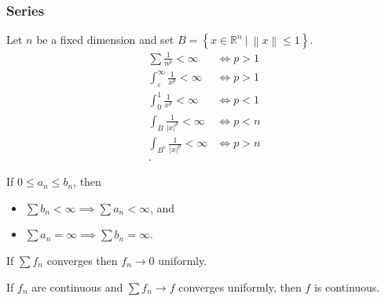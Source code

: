 \hypertarget{series}{%
\subsubsection{Series}\label{series}}

\begin{proposition}[p-tests]

Let \(n\) be a fixed dimension and set
\(B = \left\{{x\in {\mathbb{R}}^n {~\mathrel{\Big|}~}{\left\lVert {x} \right\rVert} \leq 1}\right\}\).
\begin{align*}
\sum \frac 1 {n^p} < \infty &\iff p>1 \\
\int_\varepsilon^\infty \frac 1 {x^p} < \infty 
&\iff p>1 \\
\int_0^1 \frac 1 {x^p} < \infty 
&\iff p<1 \\
\int_B \frac{1}{{\left\lvert {x} \right\rvert}^p} < \infty &\iff p < n \\
\int_{B^c} \frac{1}{{\left\lvert {x} \right\rvert}^p} < \infty &\iff p > n \\
.\end{align*}

\end{proposition}

\begin{proposition}

If \(0\leq a_n \leq b_n\), then

\begin{itemize}
\tightlist
\item
  \(\sum b_n < \infty \implies \sum a_n < \infty\), and
\item
  \(\sum a_n = \infty \implies \sum b_n = \infty\).
\end{itemize}

\end{proposition}

\begin{proposition}

If \(\sum f_n\) converges then \(f_n \to 0\) uniformly.

\end{proposition}

\begin{corollary}

If \(f_n\) are continuous and \(\sum f_n \to f\) converges uniformly,
then \(f\) is continuous.

\end{corollary}

